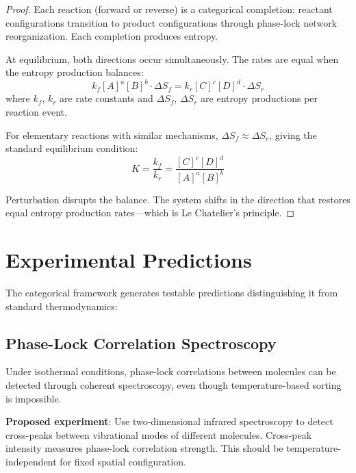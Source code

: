 \begin{proof}
Each reaction (forward or reverse) is a categorical completion: reactant configurations transition to product configurations through phase-lock network reorganization. Each completion produces entropy.

At equilibrium, both directions occur simultaneously. The rates are equal when the entropy production balances:
\begin{equation}
k_f [A]^a [B]^b \cdot \Delta S_f = k_r [C]^c [D]^d \cdot \Delta S_r
\end{equation}
where $k_f$, $k_r$ are rate constants and $\Delta S_f$, $\Delta S_r$ are entropy productions per reaction event.

For elementary reactions with similar mechanisms, $\Delta S_f \approx \Delta S_r$, giving the standard equilibrium condition:
\begin{equation}
K = \frac{k_f}{k_r} = \frac{[C]^c [D]^d}{[A]^a [B]^b}
\end{equation}

Perturbation disrupts the balance. The system shifts in the direction that restores equal entropy production rates---which is Le Chatelier's principle.
\end{proof}

\section{Experimental Predictions}
\label{sec:experimental}

The categorical framework generates testable predictions distinguishing it from standard thermodynamics:

\subsection{Phase-Lock Correlation Spectroscopy}

\begin{prediction}
Under isothermal conditions, phase-lock correlations between molecules can be detected through coherent spectroscopy, even though temperature-based sorting is impossible.
\end{prediction}

\textbf{Proposed experiment}: Use two-dimensional infrared spectroscopy to detect cross-peaks between vibrational modes of different molecules. Cross-peak intensity measures phase-lock correlation strength. This should be temperature-independent for fixed spatial configuration.

